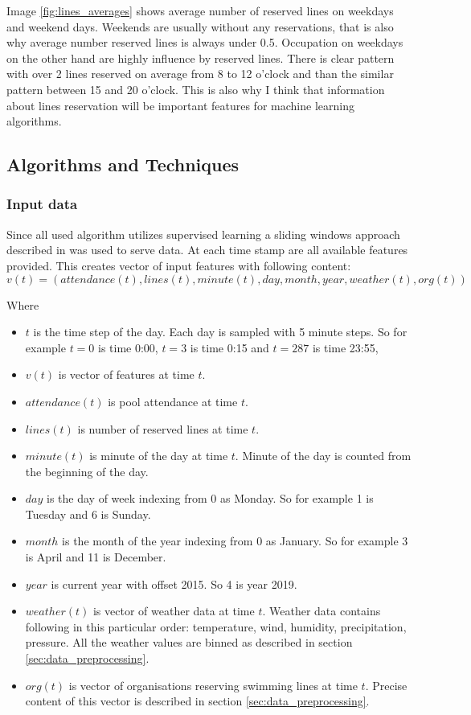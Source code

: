 \documentclass{article}
\begin{document}
Image \ref{fig:lines_averages} shows average number of reserved lines on weekdays and weekend days. Weekends are usually without any reservations, that is also why average number reserved lines is always under 0.5. Occupation on weekdays on the other hand are highly influence by reserved lines. There is clear pattern with over 2 lines reserved on average from 8 to 12 o'clock and than the similar pattern between 15 and 20 o'clock. This is also why I think that information about lines reservation will be important features for machine learning algorithms.

\subsection{Algorithms and Techniques}
\subsubsection{Input data}
Since all used algorithm utilizes supervised learning a sliding windows approach described in \citep{brownlee2019howtosupervised} was used to serve data. At each time stamp are all available features provided. This creates vector of input features with following content:
\begin{equation}
\label{eq:input_vector}
v(t) = (attendance(t), lines(t), minute(t), day, month, year, weather(t), org(t))
\end{equation}

Where 
\begin{itemize}
    \item $t$ is the time step of the day. Each day is sampled with 5 minute steps. So for example $t = 0$ is time 0:00, $t = 3$ is time 0:15 and $t = 287$ is time 23:55, 
    \item $v(t)$ is vector of features at time $t$.
    \item $attendance(t)$ is pool attendance at time $t$.
    \item $lines(t)$ is number of reserved lines at time $t$.
    \item $minute(t)$ is minute of the day at time $t$. Minute of the day is counted from the beginning of the day.
    \item $day$ is the day of week indexing from 0 as Monday. So for example 1 is Tuesday and 6 is Sunday.
    \item $month$ is the month of the year indexing from 0 as January. So for example 3 is April and 11 is December.
    \item $year$ is current year with offset 2015. So 4 is year 2019.
    \item $weather(t)$ is vector of weather data at time $t$. Weather data contains following in this particular order: temperature, wind, humidity, precipitation, pressure. All the weather values are binned as described in section \ref{sec:data_preprocessing}.
    \item $org(t)$ is  vector of organisations reserving swimming lines at time $t$. Precise content of this vector is described in section \ref{sec:data_preprocessing}.
\end{itemize}
\end{document}
